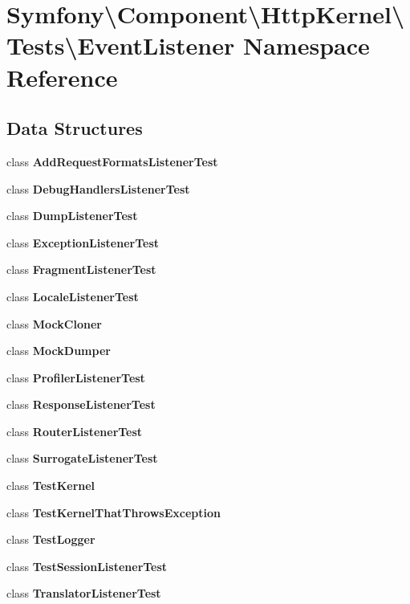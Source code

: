 \section{Symfony\textbackslash{}Component\textbackslash{}Http\+Kernel\textbackslash{}Tests\textbackslash{}Event\+Listener Namespace Reference}
\label{namespace_symfony_1_1_component_1_1_http_kernel_1_1_tests_1_1_event_listener}
\subsection*{Data Structures}
\begin{DoxyCompactItemize}
\item 
class {\bf Add\+Request\+Formats\+Listener\+Test}
\item 
class {\bf Debug\+Handlers\+Listener\+Test}
\item 
class {\bf Dump\+Listener\+Test}
\item 
class {\bf Exception\+Listener\+Test}
\item 
class {\bf Fragment\+Listener\+Test}
\item 
class {\bf Locale\+Listener\+Test}
\item 
class {\bf Mock\+Cloner}
\item 
class {\bf Mock\+Dumper}
\item 
class {\bf Profiler\+Listener\+Test}
\item 
class {\bf Response\+Listener\+Test}
\item 
class {\bf Router\+Listener\+Test}
\item 
class {\bf Surrogate\+Listener\+Test}
\item 
class {\bf Test\+Kernel}
\item 
class {\bf Test\+Kernel\+That\+Throws\+Exception}
\item 
class {\bf Test\+Logger}
\item 
class {\bf Test\+Session\+Listener\+Test}
\item 
class {\bf Translator\+Listener\+Test}
\end{DoxyCompactItemize}
